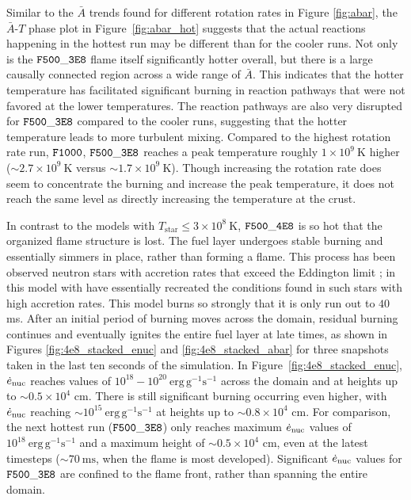 \documentclass[preprint,times,tighten]{aastex63}
\newcommand{\enucdot}{\dot{e}_{\rm nuc}}
\begin{document}
Similar to the $\bar{A}$ trends found for different rotation rates in Figure \ref{fig:abar}, the $\bar{A}$-$T$ phase plot in Figure~\ref{fig:abar_hot} suggests that the actual reactions happening in the hottest run may be different than for the cooler runs. Not only is the $\tt{F500\_3E8}$ flame itself significantly hotter overall, but there is a large causally connected region across a wide range of $\bar{A}$. This indicates that the hotter temperature has facilitated significant burning in reaction pathways that were not favored at the lower temperatures. The reaction pathways are also very disrupted for $\tt{F500\_3E8}$ compared to the cooler runs, suggesting that the hotter temperature leads to more turbulent mixing. Compared to the highest rotation rate run, $\tt{F1000}$, $\tt{F500\_3E8}$ reaches a peak temperature roughly $1 \times 10^9~\mathrm{K}$ higher ($\sim 2.7 \times 10^9~\mathrm{K}$ versus $\sim 1.7 \times 10^9~\mathrm{K}$). Though increasing the rotation rate does seem to concentrate the burning and increase the peak temperature, it does not reach the same level as directly increasing the temperature at the crust.

In contrast to the models with $T_{\mathrm{star}} \leq 3 \times 10^8~\mathrm{K}$, $\tt{F500\_4E8}$ is so hot that the organized flame structure is lost. The fuel layer undergoes stable burning and essentially simmers in place, rather than forming a flame. This process has been observed neutron stars with accretion rates that exceed the Eddington limit \citep{fujimoto1981,bildsten1998thermonuclear,keek2009effect}; in this model with have essentially recreated the conditions found in such stars with high accretion rates. This model burns so strongly that it is only run out to $40$ ms. After an initial period of burning moves across the domain, residual burning continues and eventually ignites the entire fuel layer at late times, as shown in Figures \ref{fig:4e8_stacked_enuc} and \ref{fig:4e8_stacked_abar} for three snapshots taken in the last ten seconds of the simulation. In Figure~\ref{fig:4e8_stacked_enuc}, $\enucdot$ reaches values of $10^{18} - 10^{20}~\mathrm{erg}\,\mathrm{g}^{-1} \mathrm{s}^{-1}$ across the domain and at heights up to $\sim 0.5\times 10^4$ cm. There is still significant burning occurring even higher, with $\enucdot$ reaching $\sim 10^{15}~\mathrm{erg}\,\mathrm{g}^{-1} \mathrm{s}^{-1}$ at heights up to $\sim 0.8\times 10^4$ cm. For comparison, the next hottest run ($\tt{F500\_3E8}$) only reaches maximum $\enucdot$ values of $10^{18}~\mathrm{erg}\,\mathrm{g}^{-1} \mathrm{s}^{-1}$ and a maximum height of $\sim 0.5\times 10^4$ cm, even at the latest timesteps ($\sim 70~\mathrm{ms}$, when the flame is most developed). Significant $\enucdot$ values for $\tt{F500\_3E8}$ are confined to the flame front, rather than spanning the entire domain.
\end{document}
